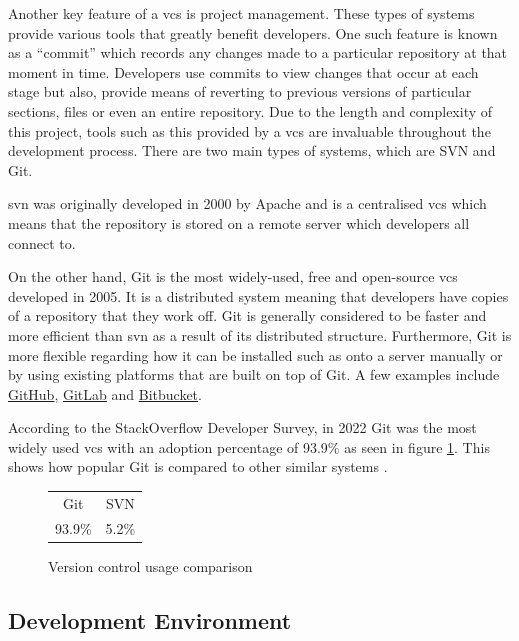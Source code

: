 \documentclass[11pt]{article}
\begin{document}
Another key feature of a \gls*{vcs} is project management. These types of
systems provide various tools that greatly benefit developers. One such feature
is known as a ``commit'' which records any changes made to a particular
repository at that moment in time. Developers use commits to view changes that
occur at each stage but also, provide means of reverting to previous versions of
particular sections, files or even an entire repository. Due to the length and
complexity of this project, tools such as this provided by a \gls*{vcs} are
invaluable throughout the development process. There are two main types of
systems, which are SVN and Git. 


\gls*{svn} was originally developed in 2000 by Apache and is a centralised
\gls*{vcs} which means that the repository is stored on a remote server which
developers all connect to.

On the other hand, Git is the most widely-used, free and open-source \gls*{vcs}
developed in 2005. It is a distributed system meaning that developers have
copies of a repository that they work off. Git is generally considered to be
faster and more efficient than \gls*{svn} as a result of its distributed
structure. Furthermore, Git is more flexible regarding how it can be
installed such as onto a server manually or by using existing platforms that are
built on top of Git. A few examples include \href{http://github.com}{GitHub},
\href{http://gitlab.com}{GitLab} and \href{https://bitbucket.org/}{Bitbucket}. 


According to the StackOverflow Developer Survey, in 2022 Git was the most widely used \gls*{vcs}
with an adoption percentage of 93.9\% as seen in figure \ref{fig:vcs_comparison}.
This shows how popular Git is compared to other similar systems \cite{vcs_survey}.

\begin{figure}[H]
\begin{center}
  \begin{tabular}{cc}
    
    \rowcolor{gray!50}
    Git & SVN \\
    93.9\% & 5.2\% \\
  \end{tabular}
\end{center}
\caption{Version control usage comparison}
\label{fig:vcs_comparison}
\end{figure}

\subsection{Development Environment}
\end{document}
